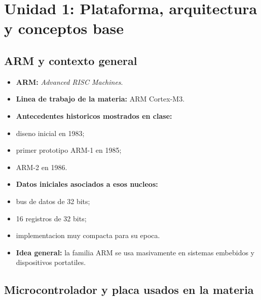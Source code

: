 \section{Unidad 1: Plataforma, arquitectura y conceptos base}

\subsection{ARM y contexto general}

\begin{itemize}
  \item \textbf{ARM:} \textit{Advanced RISC Machines}.
  \item \textbf{Linea de trabajo de la materia:} ARM Cortex-M3.
  \item \textbf{Antecedentes historicos mostrados en clase:}
  \item diseno inicial en 1983;
  \item primer prototipo ARM-1 en 1985;
  \item ARM-2 en 1986.
  \item \textbf{Datos iniciales asociados a esos nucleos:}
  \item bus de datos de 32 bits;
  \item 16 registros de 32 bits;
  \item implementacion muy compacta para su epoca.
  \item \textbf{Idea general:} la familia ARM se usa masivamente en sistemas embebidos y dispositivos portatiles.
\end{itemize}

\subsection{Microcontrolador y placa usados en la materia}

